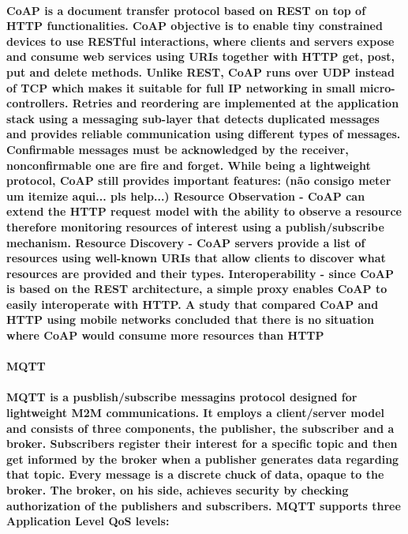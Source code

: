 \paragraph{
	\ac{CoAP} is a document transfer protocol based on \ac{REST} on top of \ac{HTTP} functionalities. \ac{CoAP} objective is to enable tiny constrained devices to use RESTful interactions, where clients and servers expose and consume web services using \ac{URIs} together with  \ac{HTTP} get, post, put and delete methods. Unlike \ac{REST}, \ac{CoAP} runs over \ac{UDP} instead of \ac{TCP} which makes it suitable for full IP networking in small micro-controllers. Retries and reordering are implemented at the application stack using a messaging sub-layer that detects duplicated messages and provides reliable communication using different types of messages. Confirmable messages must be acknowledged by the receiver, nonconfirmable one are fire and forget. While being a lightweight protocol, \ac{CoAP} still provides important features: (não consigo meter um itemize aqui... pls help...)
Resource Observation - \ac{CoAP} can extend the \ac{HTTP} request model with the ability to observe a resource therefore monitoring resources of interest using a publish/subscribe mechanism.
Resource Discovery - \ac{CoAP} servers provide a list of resources using well-known {URIs} that allow clients to discover what resources are provided and their types.
Interoperability - since \ac{CoAP} is based on the \ac{REST} architecture, a simple proxy enables \ac{CoAP} to easily interoperate with \ac{HTTP}.
A study that compared \ac{CoAP} and \ac{HTTP} using mobile networks concluded that there is no situation where \ac{CoAP} would consume more resources than \ac{HTTP} \cite{Savolainen2014}
}

\paragraph{\textbf{\ac{MQTT}}}
\paragraph{
	\ac{MQTT} is a pusblish/subscribe messagins protocol designed for lightweight \ac{M2M} communications. It employs a client/server model and consists of three components, the publisher, the subscriber and a broker.
Subscribers register their interest for a specific topic and then get informed by the broker when a publisher generates data regarding that topic. Every message is a discrete chuck of data, opaque to the broker. The broker, on his side, achieves security by checking authorization of the publishers and subscribers. \ac{MQTT} supports three Application Level \ac{QoS} levels:
}

